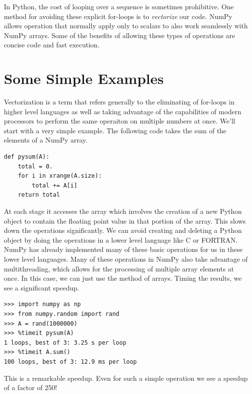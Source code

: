 \label{lab:Python_Vectorization}

In Python, the cost of looping over a sequence is sometimes prohibitive.
One method for avoiding these explicit for-loops is to \emph{vectorize} our code.
NumPy allows operation that normally apply only to scalars to also work seamlessly with NumPy arrays.
Some of the benefits of allowing these types of operations are concise code and fast execution.

\section*{Some Simple Examples}

Vectorization is a term that refers generally to the eliminating of for-loops in higher level languages as well as taking advantage of the capabilities of modern processors to perform the same operaiton on multiple numbers at once.
We'll start with a very simple example.
The following code takes the sum of the elements of a NumPy array.
\begin{lstlisting}
def pysum(A):
    total = 0.
    for i in xrange(A.size):
        total += A[i]
    return total
\end{lstlisting}
At each stage it accesses the array which involves the creation of a new Python object to contain the floating point value in that portion of the array.
This slows down the operations significantly.
We can avoid creating and deleting a Python object by doing the operations in a lower level language like C or FORTRAN.
NumPy has already implemented many of these basic operations for us in these lower level languages.
Many of these operations in NumPy also take advantage of multithreading, which allows for the processing of multiple array elements at once.
In this case, we can just use the  method of arrays.
Timing the results, we see a significant speedup.
\begin{lstlisting}
>>> import numpy as np
>>> from numpy.random import rand
>>> A = rand(1000000)
>>> %timeit pysum(A)
1 loops, best of 3: 3.25 s per loop
>>> %timeit A.sum()
100 loops, best of 3: 12.9 ms per loop
\end{lstlisting}
This is a remarkable speedup.
Even for such a simple operation we see a speedup of a factor of 250!

